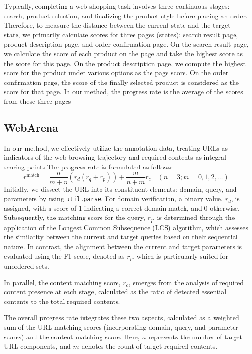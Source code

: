 Typically, completing a web shopping task involves three continuous stages: search, product selection, and finalizing the product style before placing an order. Therefore, to measure the distance between the current state and the target state, we primarily calculate scores for three pages (states): search result page, product description page, and order confirmation page. On the search result page, we calculate the score of each product on the page and take the highest score as the score for this page. On the product description page, we compute the highest score for the product under various options as the page score. On the order confirmation page, the score of the finally selected product is considered as the score for that page. In our method, the progress rate is the average of the scores from these three pages

\subsection{WebArena\label{sec: Re-annotation of WebArena}}

In our method, we effectively utilize the annotation data, treating URLs as indicators of the web browsing trajectory and required contents as integral scoring points.The progress rate is formulated as follows: 
\begin{equation}
    r^{\text{match}} = \frac{n}{m+n}(r_{d}(r_{q}+r_{p})) + \frac{m}{n+m}r_{c} \quad (n=3; m=0,1,2,\ldots) 
\end{equation}
Initially, we dissect the URL into its constituent elements: domain, query, and parameters by using \texttt{util.parse}. For domain verification, a binary value, $r_{d}$, is assigned, with a score of 1 indicating a correct domain match, and 0 otherwise. Subsequently, the matching score for the query, $r_{q}$, is determined through the application of the Longest Common Subsequence (LCS) algorithm, which assesses the similarity between the current and target queries based on their sequential nature.
In contrast, the alignment between the current and target parameters is evaluated using the F1 score, denoted as $r_{p}$, which is particularly suited for unordered sets.

In parallel, the content matching score, $r_{c}$, emerges from the analysis of required content presence at each stage, calculated as the ratio of detected essential contents to the total required contents.

The overall progress rate integrates these two aspects, calculated as a weighted sum of the URL matching scores (incorporating domain, query, and parameter scores) and the content matching score. Here, $n$ represents the number of target URL components, and $m$ denotes the count of target required contents.

